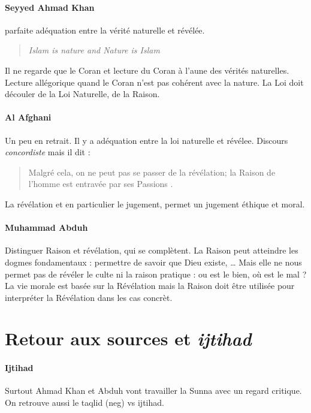  \paragraph{Seyyed Ahmad Khan} \label{Theol:AhmadKhan} parfaite adéquation entre la vérité naturelle et révélée. 
 \begin{quote}
    \textit{ Islam is nature and Nature is Islam}
 \end{quote}
 Il ne regarde que le Coran et lecture du Coran à l'aune des vérités naturelles. Lecture allégorique quand le Coran n'est pas cohérent avec la nature. La Loi doit découler de la Loi Naturelle, de la Raison. 
 
 \paragraph{Al Afghani} Un peu en retrait. Il y a adéquation entre la loi naturelle et révélee. Discours \textit{concordiste}  mais il dit : 
 \begin{quote}
     Malgré cela, on ne peut pas se passer de la révélation; la Raison de l'homme est entravée par ses Passions . 
 \end{quote}
  La révélation et en particulier le jugement, permet un jugement éthique et moral. 
  
  \paragraph{Muhammad Abduh } Distinguer Raison et révélation, qui se complètent. La Raison peut atteindre les dogmes fondamentaux :  permettre de savoir que Dieu existe, \ldots
  Mais elle ne nous permet pas de révéler le culte ni la raison pratique : ou est le bien, où est le mal ? La vie morale est basée sur la Révélation mais la Raison doit être utilisée pour interpréter la Révélation dans les cas concrèt.
  
  \section{Retour aux sources et \emph{ijtihad}}
  
\paragraph{Ijtihad} Surtout Ahmad Khan et Abduh vont travailler la Sunna avec un regard critique. 
 On retrouve aussi le taqlid (neg) vs ijtihad.
 
